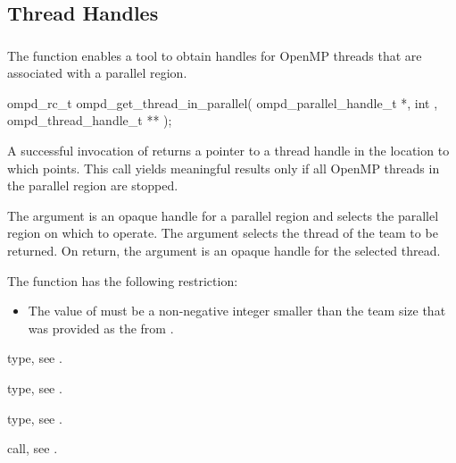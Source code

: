 \subsection{Thread Handles}



\subsubsection{}
\label{subsubsubsec:ompd_get_thread_in_parallel}

\summary
The   function enables a tool to obtain 
handles for OpenMP threads that are associated with a parallel region.

\format
\begin{cspecific}
\begin{ompSyntax}
ompd_rc_t ompd_get_thread_in_parallel(
  ompd_parallel_handle_t *,
  int ,
  ompd_thread_handle_t **
);
\end{ompSyntax}
\end{cspecific}


\descr
A successful invocation of   returns a 
pointer to a thread handle in the location to which 
points. This call yields  meaningful results only if all OpenMP threads 
in the parallel region are stopped.

\argdesc
The  argument is an opaque handle for a parallel region
and selects the parallel region on which to operate. The  
argument selects the thread of the team to be returned. On return, the 
 argument is an opaque handle for the selected thread.

\restrictions
The  function has the following restriction:

\begin{itemize}
\item The value of  must be a non-negative integer smaller 
      than the team size that was provided as the  
      from .
\end{itemize}

\begin{crossrefs}
\item {} type, 
see .

\item {} type, 
see .

\item {} type, see .

\item {} call, 
see .
\end{crossrefs}



